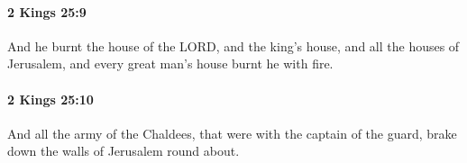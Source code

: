 		\paragraph{2 Kings 25:9} %
			\label{2KINGS-25-9}

			And he burnt the house of the LORD, and the king’s house, and all the houses of Jerusalem, and every great man’s house burnt he with fire.


		\paragraph{2 Kings 25:10} %
			\label{2KINGS-25-10}

			And all the army of the Chaldees, that were with the captain of the guard, brake down the walls of Jerusalem round about.


